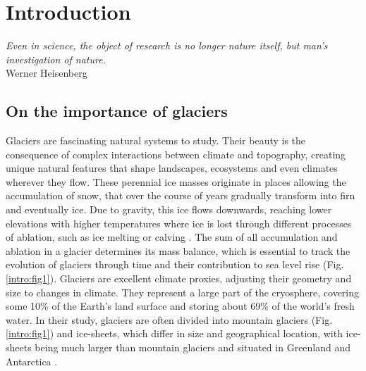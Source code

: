 \chapter{Introduction}
\label{chap:intro}

\begin{flushright}
\begin{small}
\textit{Even in science, the object of research is no longer nature itself, but man's investigation of nature.}\\
Werner Heisenberg
\end{small}
\end{flushright}

\section{On the importance of glaciers}

Glaciers are fascinating natural systems to study. Their beauty is the consequence of complex interactions between climate and topography, creating  unique natural features that shape landscapes, ecosystems and even climates wherever they flow. These perennial ice masses originate in places allowing the accumulation of snow, that over the course of years gradually transform into firn and eventually ice. Due to gravity, this ice flows downwards, reaching lower elevations with higher temperatures where ice is lost through different processes of ablation, such as ice melting or calving \citep{ipcc_climate_2018}. The sum of all accumulation and ablation in a glacier determines its mass balance, which is essential to track the evolution of glaciers through time and their contribution to sea level rise (Fig. \ref{intro:fig1}). Glaciers are excellent climate proxies, adjusting their geometry and size to changes in climate. They represent a large part of the cryosphere, covering some 10\% of the Earth's land surface and storing about 69\% of the world's fresh water. In their study, glaciers are often divided into mountain glaciers (Fig. \ref{intro:fig1}) and ice-sheets, which differ in size and geographical location, with ice-sheets being much larger than mountain glaciers and situated in Greenland and Antarctica \citep{benn_glaciers_2014}.  


